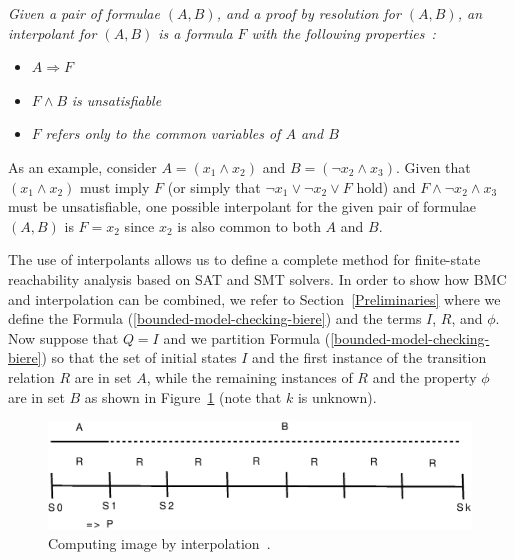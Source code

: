 \documentclass[format=acmsmall, review=false, screen=true]{acmart}
\begin{document}
\begin{definition}\label{interpolants}
\textit{Given a pair of formulae $\left(A,B\right)$, and a proof by resolution for $\left(A,B\right)$, an \textit{interpolant} for $\left(A,B\right)$ is a formula $F$ with the following properties~\cite{McMillan03,McMillan05}: }

\begin{itemize}
	\item $A \Rightarrow F$
	\item $F \wedge B$ \textit{is unsatisfiable}
	\item $F$ \textit{refers only to the common variables of $A$ and $B$}
\end{itemize}
\end{definition}

As an example, consider $A = \left(x_1 \wedge x_2\right)$ and $B = \left(\neg x_2 \wedge x_3\right)$. Given that $\left(x_1 \wedge x_2\right)$ must imply $F$ (or simply that $\neg x_1 \vee \neg x_2 \vee F$ hold) and $F \wedge \neg x_2 \wedge x_3$ must be unsatisfiable, one possible interpolant for the given pair of formulae $\left(A,B\right)$ is $F = x_2$ since $x_2$ is also common to both $A$ and $B$. 

The use of interpolants allows us to define a complete method for finite-state reachability analysis based on SAT and SMT solvers. In order to show how BMC and interpolation can be combined, we refer to Section~\ref{Preliminaries} where we define the Formula (\ref{bounded-model-checking-biere}) and the terms $I$, $R$, and $\phi$. Now suppose that $Q=I$ and we partition Formula (\ref{bounded-model-checking-biere}) so that the set of initial states $I$ and the first instance of the transition relation $R$ are in set $A$, while the remaining instances of $R$ and the property $\phi$ are in set $B$ as shown in Figure~\ref{figure:computing-image-by-interpolation} (note that $k$ is unknown).

\begin{figure}[ht]
\centering
\includegraphics[scale=0.4]{interpolants}
\caption{Computing image by interpolation~\cite{McMillan03}.}
\label{figure:computing-image-by-interpolation}
\end{figure}
\end{document}
